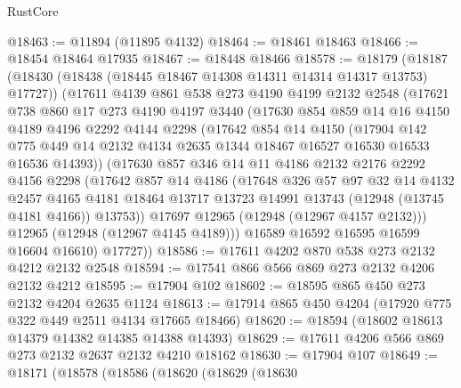 \begin{lexlean}{RustCore}
\begin{coremodule}
@18463 := @11894 (@11895 @4132)
@18464 := @18461 @18463
@18466 := @18454 @18464 @17935
@18467 := @18448 @18466
@18578 := @18179
    (@18187
      (@18430 (@18438 (@18445 @18467 @14308 @14311 @14314 @14317 @13753) @17727))
      (@17611
        @4139
        @861
        @538
        @273
        @4190
        @4199
        @2132
        @2548
        (@17621
          @738
          @860
          @17
          @273
          @4190
          @4197
          @3440
          (@17630
            @854
            @859
            @14
            @16
            @4150
            @4189
            @4196
            @2292
            @4144
            @2298
            (@17642
              @854
              @14
              @4150
              (@17904
                @142
                @775
                @449
                @14
                @2132
                @4134
                @2635
                @1344
                @18467
                @16527
                @16530
                @16533
                @16536
                @14393))
            (@17630
              @857
              @346
              @14
              @11
              @4186
              @2132
              @2176
              @2292
              @4156
              @2298
              (@17642
                @857
                @14
                @4186
                (@17648
                  @326
                  @57
                  @97
                  @32
                  @14
                  @4132
                  @2457
                  @4165
                  @4181
                  @18464
                  @13717
                  @13723
                  @14991
                  @13743
                  (@12948 (@13745 @4181 @4166))
                  @13753))
              @17697
              @12965
              (@12948 (@12967 @4157 @2132)))
            @12965
            (@12948 (@12967 @4145 @4189)))
          @16589
          @16592
          @16595
          @16599
          @16604
          @16610)
        @17727))
@18586 := @17611 @4202 @870 @538 @273 @2132 @4212 @2132 @2548
@18594 := @17541 @866 @566 @869 @273 @2132 @4206 @2132 @4212
@18595 := @17904 @102
@18602 := @18595 @865 @450 @273 @2132 @4204 @2635 @1124
@18613 := @17914 @865 @450 @4204 (@17920 @775 @322 @449 @2511 @4134 @17665 @18466)
@18620 := @18594 (@18602 @18613 @14379 @14382 @14385 @14388 @14393)
@18629 := @17611 @4206 @566 @869 @273 @2132 @2637 @2132 @4210 @18162
@18630 := @17904 @107
@18649 := @18171
    (@18578
      (@18586
        (@18620
          (@18629
            (@18630

\end{coremodule}
\end{lexlean}
